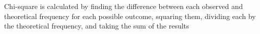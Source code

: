 \documentclass[a4paper]{sig-alternate}
\begin{document}
Chi-square is calculated by finding the difference between each observed and theoretical frequency for each possible outcome, squaring them, dividing each by the theoretical frequency, and taking the sum of the results

%
%
\end{document}
